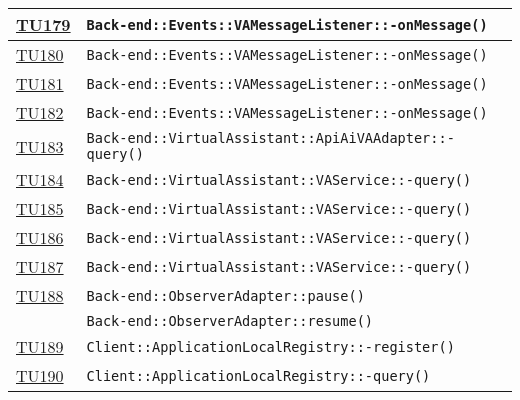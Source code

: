 \begin{longtable}{|>{\centering}m{1cm}|m{12cm}<{\centering}|}
\hyperlink{TU179}{TU179} & \texttt{Back-end::Events::VAMessageListener::-\linebreak onMessage()}\\ \hline

\hyperlink{TU180}{TU180} & \texttt{Back-end::Events::VAMessageListener::-\linebreak onMessage()}\\ \hline

\hyperlink{TU181}{TU181} & \texttt{Back-end::Events::VAMessageListener::-\linebreak onMessage()}\\ \hline

\hyperlink{TU182}{TU182} & \texttt{Back-end::Events::VAMessageListener::-\linebreak onMessage()}\\ \hline

\hyperlink{TU183}{TU183} & \texttt{Back-end::VirtualAssistant::ApiAiVAAdapter::-\linebreak query()}\\ \hline

\hyperlink{TU184}{TU184} & \texttt{Back-end::VirtualAssistant::VAService::-\linebreak query()}\\ \hline

\hyperlink{TU185}{TU185} & \texttt{Back-end::VirtualAssistant::VAService::-\linebreak query()}\\ \hline

\hyperlink{TU186}{TU186} & \texttt{Back-end::VirtualAssistant::VAService::-\linebreak query()}\\ \hline

\hyperlink{TU187}{TU187} & \texttt{Back-end::VirtualAssistant::VAService::-\linebreak query()}\\ \hline

\hyperlink{TU188}{TU188} & \texttt{Back-end::ObserverAdapter::pause()}\\ & \texttt{Back-end::ObserverAdapter::resume()}\\ \hline

\hyperlink{TU189}{TU189} & \texttt{Client::ApplicationLocalRegistry::-\linebreak register()}\\ \hline

\hyperlink{TU190}{TU190} & \texttt{Client::ApplicationLocalRegistry::-\linebreak query()}\\ \hline


\end{longtable}
